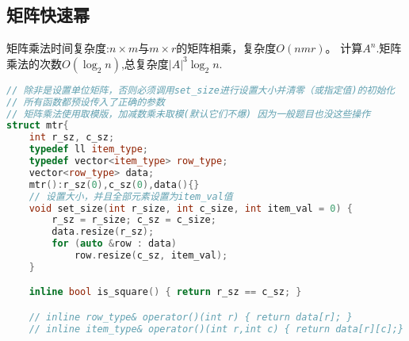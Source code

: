     \subsection{矩阵快速幂}
        矩阵乘法时间复杂度:$n \times m$与$m \times r$的矩阵相乘，复杂度$O(nmr)$。
        计算$A^n$.矩阵乘法的次数$O(\log_2{n})$,总复杂度$|A|^3\log_2{n}$.
        \begin{lstlisting}[language={c++}]
// 除非是设置单位矩阵，否则必须调用set_size进行设置大小并清零（或指定值)的初始化
// 所有函数都预设传入了正确的参数
// 矩阵乘法使用取模版，加减数乘未取模(默认它们不爆) 因为一般题目也没这些操作
struct mtr{
    int r_sz, c_sz;
    typedef ll item_type;
    typedef vector<item_type> row_type;
    vector<row_type> data;
    mtr():r_sz(0),c_sz(0),data(){}
    // 设置大小，并且全部元素设置为item_val值
    void set_size(int r_size, int c_size, int item_val = 0) { 
        r_sz = r_size; c_sz = c_size;
        data.resize(r_sz);
        for (auto &row : data)
            row.resize(c_sz, item_val);
    }

    inline bool is_square() { return r_sz == c_sz; }

    // inline row_type& operator()(int r) { return data[r]; }
    // inline item_type& operator()(int r,int c) { return data[r][c];}


\end{lstlisting}
